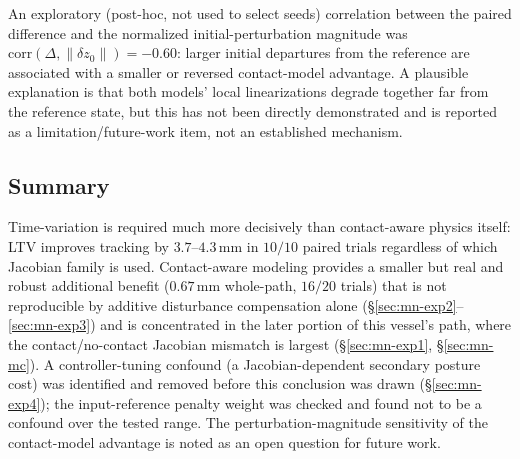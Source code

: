 \documentclass[journal]{IEEEtran}
\begin{document}
An exploratory (post-hoc, not used to select seeds) correlation
between the paired difference and the normalized initial-perturbation
magnitude was $\mathrm{corr}(\Delta,\lVert\delta z_0\rVert)=-0.60$:
larger initial departures from the reference are associated with a
smaller or reversed contact-model advantage. A plausible explanation
is that both models' local linearizations degrade together far from
the reference state, but this has not been directly demonstrated and
is reported as a limitation/future-work item, not an established
mechanism.

\subsection{Summary}
\label{sec:mn-summary}

Time-variation is required much more decisively than contact-aware
physics itself: LTV improves tracking by $3.7$--$4.3\,\mathrm{mm}$ in
$10/10$ paired trials regardless of which Jacobian family is used.
Contact-aware modeling provides a smaller but real and robust
additional benefit ($0.67\,\mathrm{mm}$ whole-path, $16/20$ trials)
that is not reproducible by additive disturbance compensation alone
(\S\ref{sec:mn-exp2}--\ref{sec:mn-exp3}) and is concentrated in the
later portion of this vessel's path, where the contact/no-contact
Jacobian mismatch is largest (\S\ref{sec:mn-exp1},
\S\ref{sec:mn-mc}). A controller-tuning confound (a Jacobian-dependent
secondary posture cost) was identified and removed before this
conclusion was drawn (\S\ref{sec:mn-exp4}); the input-reference penalty
weight was checked and found not to be a confound over the tested
range. The perturbation-magnitude sensitivity of the contact-model
advantage is noted as an open question for future work.
\end{document}
